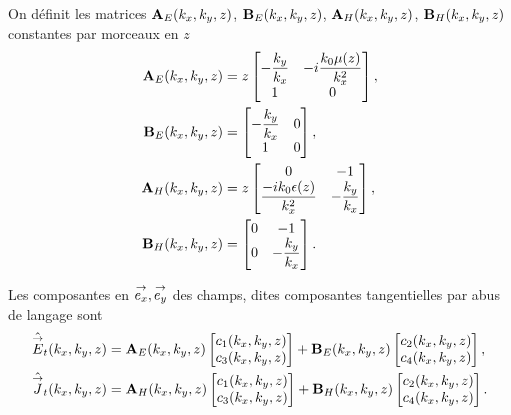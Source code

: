 

  On définit les matrices \(\mathbf{A}_{E}(k_x,k_y,z)\), \(\mathbf{B}_{E}(k_x,k_y,z)\), \(\mathbf{A}_{H}(k_x,k_y,z)\), \(\mathbf{B}_{H}(k_x,k_y,z)\) constantes par morceaux en \(z\)
  \begin{align*}
    \mathbf{A}_{E}(k_x,k_y,z) &= z
    \begin{bmatrix}
      -\dfrac{k_y}{k_x} & -i\dfrac{k_0\mu(z)}{k_x^2}
      \\
      1 & 0
    \end{bmatrix},
    \\
    \mathbf{B}_{E}(k_x,k_y,z) &= 
    \begin{bmatrix}
      -\dfrac{k_y}{k_x} & 0
      \\
      1 & 0
    \end{bmatrix},
    \\
    \mathbf{A}_{H}(k_x,k_y,z) &= z
    \begin{bmatrix}
      0 & -1
      \\
      \dfrac{-ik_0\epsilon(z)}{k_x^2} & -\dfrac{k_y}{k_x}
    \end{bmatrix},
    \\
    \mathbf{B}_{H}(k_x,k_y,z) &= 
    \begin{bmatrix}
      0 & -1
      \\
      0 & -\dfrac{k_y}{k_x}
    \end{bmatrix}.
  \end{align*}

  Les composantes en \({\overset{\rightarrow}{e_x}},{\overset{\rightarrow}{e_y}}\) des champs, dites composantes tangentielles par abus de langage sont
  \begin{align*}
      \hat{{\overset{\rightarrow}{E}}}_t(k_x,k_y,z) &= \mathbf{A}_E(k_x,k_y,z) \begin{bmatrix}c_1(k_x,k_y,z) \\ c_3(k_x,k_y,z)\end{bmatrix} + \mathbf{B}_E(k_x,k_y,z) \begin{bmatrix}c_2(k_x,k_y,z) \\ c_4(k_x,k_y,z)\end{bmatrix},
      \\
      \hat{{\overset{\rightarrow}{J}}}_t(k_x,k_y,z) &= \mathbf{A}_H(k_x,k_y,z) \begin{bmatrix}c_1(k_x,k_y,z) \\ c_3(k_x,k_y,z)\end{bmatrix} + \mathbf{B}_H(k_x,k_y,z) \begin{bmatrix}c_2(k_x,k_y,z) \\ c_4(k_x,k_y,z)\end{bmatrix}.
  \end{align*}

